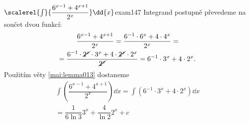 \begin{mathexam}{\(\protect\scalerel{\int}{\dfrac{6^{x-1} + 4^{x+1}}{2^x}}\dd{x}\)}{exam147} 
  Integrand postupně převedeme na součet dvou funkcí:
  \begin{multline*}
    \dfrac{6^{x-1} + 4^{x+1}}{2^x} = \dfrac{6^{-1}\cdot6^x + 4\cdot4^x}{2^x} =   \\
      = \dfrac{6^{-1}\cdot\cancel{2^x}\cdot3^x + 4\cdot\cancel{2^x}\cdot2^x}{\cancel{2^x}} 
      = 6^{-1}\cdot3^x + 4\cdot2^x. 
  \end{multline*}
  Použitím věty \ref{mai:lemma013} dostaneme
  \begin{multline*}
    \int\left(\dfrac{6^{x-1}+4^{x+1}}{2^x}\right)\dd{x} = \int(6^{-1}\cdot3^x + 4\cdot2^x)\dd{x} \\
      = \dfrac{1}{6\ln3}3^x + \dfrac{4}{\ln2}2^x + c
  \end{multline*}
\end{mathexam}